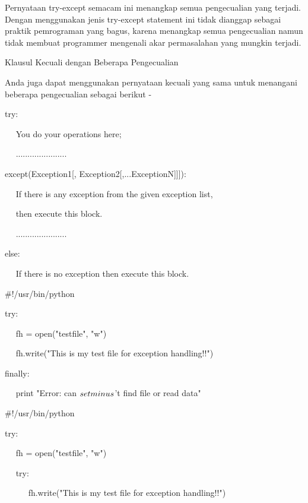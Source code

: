 \vspace{12pt}
Pernyataan try-except semacam ini menangkap semua pengecualian yang terjadi. Dengan menggunakan jenis try-except statement ini tidak dianggap sebagai praktik pemrograman yang bagus, karena menangkap semua pengecualian namun tidak membuat programmer mengenali akar permasalahan yang mungkin terjadi. \par
Klausul Kecuali dengan Beberapa Pengecualian \par
\vspace{12pt}
Anda juga dapat menggunakan pernyataan kecuali yang sama untuk menangani beberapa pengecualian sebagai berikut - \par
\vspace{12pt}
try: \par
~~ You do your operations here; \par
~~ ...................... \par
except(Exception1[, Exception2[,...ExceptionN]]]): \par
~~ If there is any exception from the given exception list,  \par
~~ then execute this block. \par
~~ ...................... \par
else: \par
~~ If there is no exception then execute this block.  \par
\vspace{12pt}
\vspace{12pt}
 $  \#  $!/usr/bin/python \par
\vspace{12pt}
try: \par
~~ fh = open("testfile", "w") \par
~~ fh.write("This is my test file for exception handling!!") \par
finally: \par
~~ print "Error: can $  \\setminus  $'t find file or read data" \par
\vspace{12pt}
\vspace{12pt}
 $  \#  $!/usr/bin/python \par
\vspace{12pt}
try: \par
~~ fh = open("testfile", "w") \par
~~ try: \par
~~~~~ fh.write("This is my test file for exception handling!!") \par
